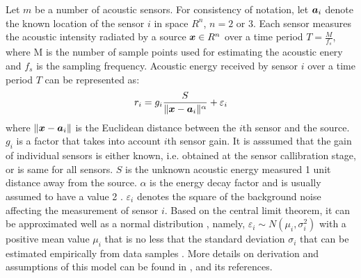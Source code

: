 Let $m$ be a number of acoustic sensors. For consistency of notation, let $\mbox{\boldmath$a$}_i$ denote the known location of the sensor $i$ in space $R^n$, $n = 2$ or $3$. Each sensor measures the acoustic intensity radiated by a source $\mbox{\boldmath$x$}\in R^n$ over a time period $T = \frac{M}{f_s}$, where M is the number of sample points used for estimating the acoustic enery and $f_s$ is the sampling frequency. %
 Acoustic energy received by sensor $i$ over a time period $T$ can be represented as:
\begin{equation} \label{eq:3.33}
r_i = g_i \frac{S}{\|\mbox{\boldmath$x$} - \mbox{\boldmath$a$}_i\|^\alpha} + \varepsilon_i
\end{equation}
where $\|\mbox{\boldmath$x$} - \mbox{\boldmath$a$}_i\|$ is the Euclidean distance between the $i$th sensor and the source. $g_i$ is a factor that takes into account $i$th sensor gain. It is asssumed that the gain of individual sensors is either known, i.e. obtained at the sensor callibration stage, or is same for all sensors. $S$ is the unknown acoustic energy measured 1 unit distance away from the source. $\alpha$ is the energy decay factor %
and is usually assumed to have a value 2 \cite{LiHu}. $\varepsilon_i$ denotes the square of the background noise affecting the measurement of sensor $i$. Based on the central limit theorem, it can be approximated well as a normal distribution%
, namely, $\varepsilon_i \sim N(\mu_i, \sigma_i^2)$ with a positive mean value $\mu_i$ that is no less that the standard deviation $\sigma_i$ that can be estimated empirically from data samples \cite{LiHu}. More details on derivation and assumptions of this model can be found in %
\cite{LiHu}\cite{Saric}, \cite{LiuHuPan} and its references. %


